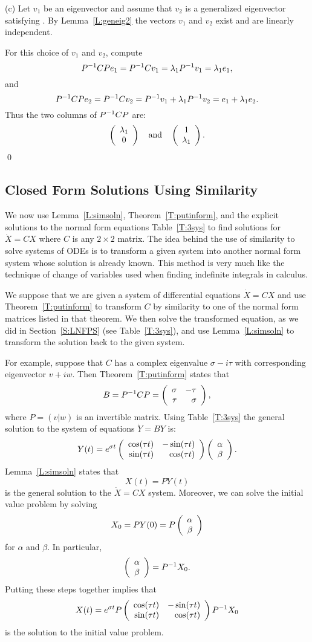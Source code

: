 (c) \quad   Let $v_1$ be an eigenvector and assume that $v_2$ is a
generalized eigenvector satisfying .  By
Lemma~\ref{L:geneig2} the vectors $v_1$ and $v_2$ exist and are linearly
independent.

For this choice of $v_1$ and $v_2$, compute
\[
P^{-1} CPe_1 = P^{-1} Cv_1 = \lambda_1 P^{-1} v_1 = \lambda_1 e_1,
\]
and
\[
P^{-1} CPe_2 = P^{-1} Cv_2 = P^{-1} v_1+\lambda_1 P^{-1} v_2 = e_1+\lambda_1 e_2.
\]
Thus the two columns of $P^{-1} CP$ are:
\[
\left(\begin{array}{c} \lambda_1 \\ 0\end{array}\right) \quad\mbox{and}\quad \left(\begin{array}{c} 1 \\ \lambda_1\end{array}\right).
\]
  \qed


\subsection*{Closed Form Solutions Using Similarity}

We now use Lemma~\ref{L:simsoln}, Theorem~\ref{T:putinform}, and the
explicit solutions to the normal form equations Table~\ref{T:3sys}
to find solutions for $\dot{X}=CX$ where $C$ is any $2\times 2$ matrix.
The idea behind the use of similarity to solve systems of ODEs is to
transform a given system into another normal form system whose solution is
already known.  This method is very much like the technique of change of
variables used when finding indefinite integrals in calculus.

We suppose that we are given a system of differential equations $\dot{X}=CX$
and use Theorem~\ref{T:putinform} to transform $C$ by similarity to one of
the normal form matrices listed in that theorem.  We then solve the
transformed equation, as we did in Section~\ref{S:LNFPS} (see
Table~\ref{T:3sys}), and use Lemma~\ref{L:simsoln} to transform the solution
back to the given system.

For example, suppose that $C$ has a complex eigenvalue $\sigma-i\tau$ with
corresponding eigenvector $v+iw$.  Then Theorem~\ref{T:putinform} states that
\[
B = P^{-1} CP = \left(\begin{array}{rr} \sigma & -\tau\\ \tau &\sigma\end{array}\right),
\]
where $P=(v|w)$ is an invertible matrix.  Using Table~\ref{T:3sys} the
general solution to the system of equations $\dot{Y}=BY$ is:
\[
Y(t) = e^{\sigma t}
\left(\begin{array}{rr} \cos(\tau t) & -\sin(\tau t)\\ \sin(\tau t) &\cos(\tau t)\end{array}\right)
\left(\begin{array}{r} \alpha \\ \beta\end{array}\right).
\]
Lemma~\ref{L:simsoln} states that
\[
X(t) = PY(t)
\]
is the general solution to the $\dot{X}=CX$ system.  Moreover, we can solve
the initial value problem by solving
\[
X_0 = PY(0) = P\left(\begin{array}{r} \alpha \\ \beta\end{array}\right)
\]
for $\alpha$ and $\beta$.  In particular,
\[
\left(\begin{array}{r} \alpha \\ \beta\end{array}\right) = P^{-1} X_0.
\]
Putting these steps together implies that
\begin{equation} \label{e:exp0ev}
X(t) = e^{\sigma t}
P\left(\begin{array}{rr} \cos(\tau t) & -\sin(\tau t)\\ \sin(\tau t) &\cos(\tau t)\end{array}\right)P^{-1} X_0
\end{equation}
is the solution to the initial value problem.

